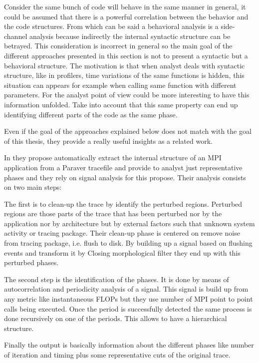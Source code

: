 Consider the same bunch of code will behave in the same
manner in general, it could be assumed that there is a powerful correlation 
between the behavior and the code structures. From which can be said a 
behavioral analysis is a side-channel analysis because indirectly the internal 
syntactic structure can be
betrayed. This consideration is incorrect in general so the
main goal of the different approaches presented in this section is not
to present a syntactic but a behavioral structure. The motivation is that when
analyst deals with syntactic structure, like in profilers, time variations of 
the same functions is
hidden, this situation can appears for example when calling same function with
different parameters. For the analyst point of view could be more interesting to
have this information unfolded. Take into account that this same property can
end up identifying different parts of the code as the same phase.

Even if the goal of the approaches explained below does not match with the
goal of this thesis, they provide a really useful insights as a related work.

In \cite{casas2007automatic} they propose 
automatically extract the internal structure of an MPI application from a
Paraver tracefile and provide to analyst just representative phases and they 
rely on signal analysis for this propose. 
Their analysis consists on two main steps:
\begin{enumerate*}[label=\roman*)]
    \item The first is to clean-up the trace by identify the perturbed regions.
Perturbed regions are those parts of the trace that has been perturbed nor by
the application nor by architecture but by external factors such that unknown
system activity or tracing package. Their clean-up phase is centered on remove
noise from tracing package, i.e. flush to disk. By building up a signal based
on flushing events and transform it by Closing morphological filter they end up
with this perturbed phases. 
    \item The second step is the identification of the
phases. It is done by means of autocorrelation and periodicity analysis of a
signal. This signal is build up from any metric like instantaneous FLOPs but
they use number of MPI point to point calls being executed. Once the period is
successfully detected the same process is done recursively on one of the
periods. This allows to have a hierarchical structure. 
\end{enumerate*}
Finally the output is
basically information about the different phases like number of iteration and
timing plus some representative cuts of the original trace. 

